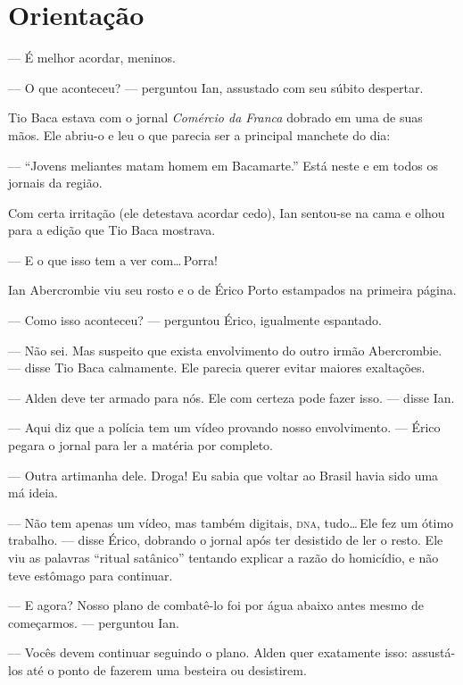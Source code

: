 \chapter{Orientação}


--- É melhor acordar, meninos.

--- O que aconteceu? --- perguntou Ian, assustado com seu súbito
despertar.

Tio Baca estava com o jornal \textit{Comércio da Franca} dobrado em uma
de suas mãos. Ele abriu-o e leu o que parecia ser a principal manchete
do dia:

--- “Jovens meliantes matam homem em Bacamarte.” Está neste e em todos
os jornais da região.

Com certa irritação (ele detestava acordar cedo), Ian sentou-se na cama
e olhou para a edição que Tio Baca mostrava.

--- E o que isso tem a ver com\ldots\,Porra!

Ian Abercrombie viu seu rosto e o de Érico Porto estampados na primeira
página.

--- Como isso aconteceu? --- perguntou Érico, igualmente espantado.

--- Não sei. Mas suspeito que exista envolvimento do outro irmão
Abercrombie. --- disse Tio Baca calmamente. Ele parecia querer evitar
maiores exaltações.

--- Alden deve ter armado para nós. Ele com certeza pode fazer isso. ---
disse Ian.

--- Aqui diz que a polícia tem um vídeo provando nosso envolvimento. ---
Érico pegara o jornal para ler a matéria por completo.

--- Outra artimanha dele. Droga! Eu sabia que voltar ao Brasil havia
sido uma má ideia.

--- Não tem apenas um vídeo, mas também digitais, \textsc{dna},
tudo\ldots\,Ele fez um ótimo trabalho. --- disse Érico, dobrando o
jornal após ter desistido de ler o resto. Ele viu as palavras “ritual
satânico” tentando explicar a razão do homicídio, e não teve estômago
para continuar.

--- E agora? Nosso plano de combatê-lo foi por água abaixo antes mesmo
de começarmos. --- perguntou Ian.

--- Vocês devem continuar seguindo o plano. Alden quer exatamente isso:
assustá-los até o ponto de fazerem uma besteira ou desistirem.

